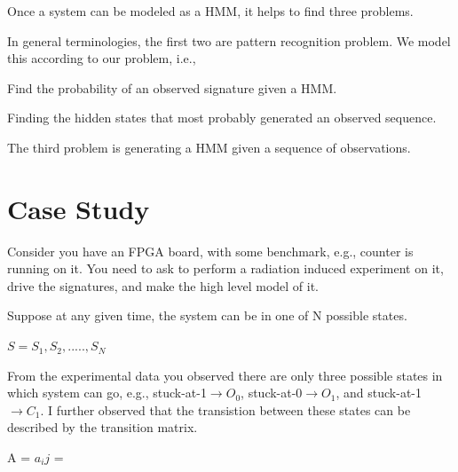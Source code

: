 Once a system can be modeled as a HMM, it helps to find three problems.

In general terminologies, the first two are pattern recognition problem. We model this according to our problem, i.e.,

\begin{tcolorbox}[width=\textwidth,colback={gray},title={Evaluation },colbacktitle=gray,coltitle=black]  

Find the probability of an observed signature given a HMM.  
\end{tcolorbox}


\begin{tcolorbox}[width=\textwidth,colback={gray},title={Decoding },colbacktitle=gray,coltitle=black]  

Finding the hidden states that most probably generated an observed sequence. 
\end{tcolorbox}

\begin{tcolorbox}[width=\textwidth,colback={gray},title={Learning },colbacktitle=gray,coltitle=black]  

The third problem is generating a HMM given a sequence of observations.
\end{tcolorbox}



\section{Case Study}


Consider you have an FPGA board, with some benchmark, e.g., counter is running on it. You need to  ask to perform a radiation induced experiment on it, drive the signatures, and make the high level model of it.

Suppose at any given time, the system can be in one of N possible states.

\begin{center}
$S = {S_1, S_2,....., S_N}$
\end{center}

From the experimental data you observed there are only three possible states in which system can go, e.g., stuck-at-1$\rightarrow O_{0}$, stuck-at-0$\rightarrow O_{1}$, and stuck-at-1$\rightarrow C_{1}$. I further observed that the transistion between these states can be described by the transition matrix.


\begin{center}


A = {$a_ij$} = 
\end{center}

